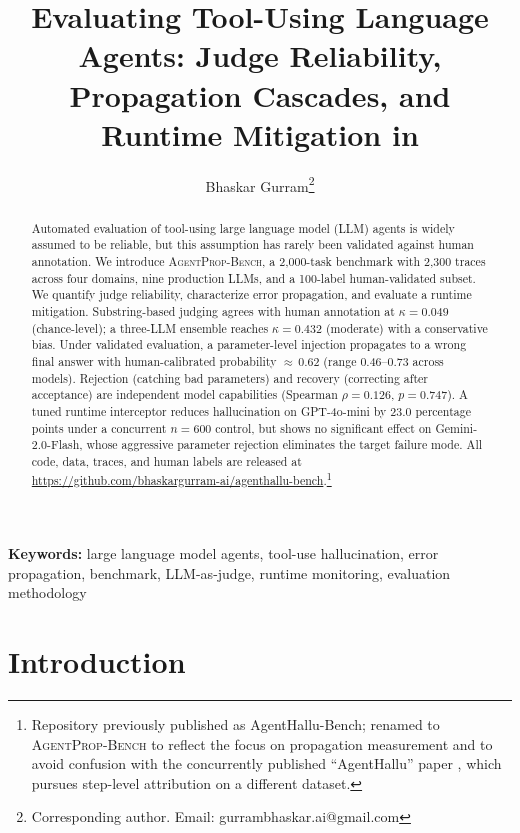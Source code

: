 \documentclass[11pt]{article}
\title{Evaluating Tool-Using Language Agents: Judge Reliability,\\
Propagation Cascades, and Runtime Mitigation in \bench{}}
\author[1]{Bhaskar Gurram\thanks{Corresponding author. Email: gurrambhaskar.ai@gmail.com}}
\affil[1]{Zasti Inc., Ashburn, VA, USA}
\date{}
\newcommand{\bench}{\textsc{AgentProp-Bench}\xspace}
\begin{document}
\maketitle

\begin{abstract}
Automated evaluation of tool-using large language model (LLM) agents is
widely assumed to be reliable, but this assumption has rarely been
validated against human annotation.
We introduce \bench{}, a 2{,}000-task benchmark with 2{,}300 traces
across four domains, nine production LLMs, and a 100-label
human-validated subset.
We quantify judge reliability, characterize error propagation, and
evaluate a runtime mitigation.
Substring-based judging agrees with human annotation at $\kappa{=}0.049$
(chance-level); a three-LLM ensemble reaches $\kappa{=}0.432$ (moderate)
with a conservative bias.
Under validated evaluation, a parameter-level injection propagates to a
wrong final answer with human-calibrated probability ${\approx}\,0.62$
(range 0.46--0.73 across models).
Rejection (catching bad parameters) and recovery (correcting after
acceptance) are independent model capabilities
(Spearman $\rho{=}0.126$, $p{=}0.747$).
A tuned runtime interceptor reduces hallucination on GPT-4o-mini by
23.0 percentage points under a concurrent $n{=}600$ control, but shows
no significant effect on Gemini-2.0-Flash, whose aggressive parameter
rejection eliminates the target failure mode.
All code, data, traces, and human labels are released at
\url{https://github.com/bhaskargurram-ai/agenthallu-bench}.\footnote{Repository
previously published as AgentHallu-Bench; renamed to \bench{} to
reflect the focus on propagation measurement and to avoid confusion
with the concurrently published ``AgentHallu'' paper
\citep{liu2026agenthallu}, which pursues step-level attribution on a
different dataset.}
\end{abstract}

\noindent\textbf{Keywords:}
large language model agents, tool-use hallucination,
error propagation, benchmark, LLM-as-judge,
runtime monitoring, evaluation methodology

\vspace{1em}

\section{Introduction}
\label{sec:intro}
\end{document}
